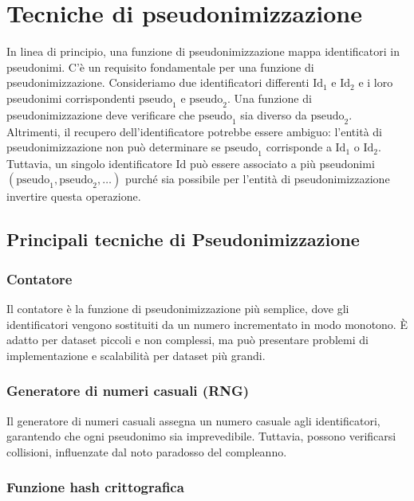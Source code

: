 \chapter{Tecniche di pseudonimizzazione}

In linea di principio, una funzione di pseudonimizzazione mappa identificatori in pseudonimi. C'è un requisito fondamentale per una funzione di pseudonimizzazione. Consideriamo due identificatori differenti \( \text{Id}_1 \) e \( \text{Id}_2 \) e i loro pseudonimi corrispondenti \( \text{pseudo}_1 \) e \( \text{pseudo}_2 \). Una funzione di pseudonimizzazione deve verificare che \( \text{pseudo}_1 \) sia diverso da \( \text{pseudo}_2 \). Altrimenti, il recupero dell'identificatore potrebbe essere ambiguo: l'entità di pseudonimizzazione non può determinare se \( \text{pseudo}_1 \) corrisponde a \( \text{Id}_1 \) o \( \text{Id}_2 \). Tuttavia, un singolo identificatore \( \text{Id} \) può essere associato a più pseudonimi \( (\text{pseudo}_1, \text{pseudo}_2, \ldots) \) purché sia possibile per l'entità di pseudonimizzazione invertire questa operazione.

\section{Principali tecniche di Pseudonimizzazione}

\subsection{Contatore}

Il contatore è la funzione di pseudonimizzazione più semplice, dove gli identificatori vengono sostituiti da un numero incrementato in modo monotono. È adatto per dataset piccoli e non complessi, ma può presentare problemi di implementazione e scalabilità per dataset più grandi.

\subsection{Generatore di numeri casuali (RNG)}

Il generatore di numeri casuali assegna un numero casuale agli identificatori, garantendo che ogni pseudonimo sia imprevedibile. Tuttavia, possono verificarsi collisioni, influenzate dal noto paradosso del compleanno.

\subsection{Funzione hash crittografica}

